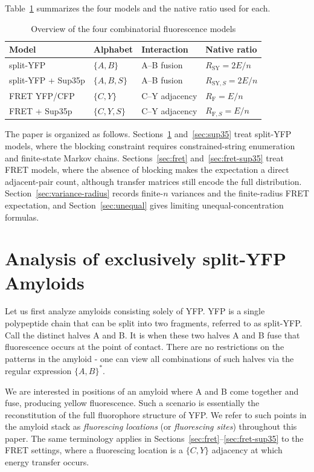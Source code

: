 \documentclass[referee,lineno,pdflatex,sn-mathphys-ay]{sn-jnl}
\begin{document}
Table~\ref{tab:model-overview} summarizes the four models and the native ratio used for each.

\begin{table}[ht]
\caption{Overview of the four combinatorial fluorescence models}\label{tab:model-overview}
\centering
\begin{tabular}{llll}
\hline
Model & Alphabet & Interaction & Native ratio \\
\hline
split-YFP & $\{A,B\}$ & A--B fusion & $R_{\text{SY}}=2E/n$ \\
split-YFP + Sup35p & $\{A,B,S\}$ & A--B fusion & $R_{\text{SY},S}=2E/n$ \\
FRET YFP/CFP & $\{C,Y\}$ & C--Y adjacency & $R_{\text{F}}=E/n$ \\
FRET + Sup35p & $\{C,Y,S\}$ & C--Y adjacency & $R_{\text{F},S}=E/n$ \\
\hline
\end{tabular}
\end{table}

The paper is organized as follows. Sections~\ref{sec:split-yfp} and~\ref{sec:sup35} treat split-YFP models, where the blocking constraint requires constrained-string enumeration and finite-state Markov chains. Sections~\ref{sec:fret} and~\ref{sec:fret-sup35} treat FRET models, where the absence of blocking makes the expectation a direct adjacent-pair count, although transfer matrices still encode the full distribution. Section~\ref{sec:variance-radius} records finite-$n$ variances and the finite-radius FRET expectation, and Section~\ref{sec:unequal} gives limiting unequal-concentration formulas.

\section{Analysis of exclusively split-YFP Amyloids}\label{sec:split-yfp}
Let us first analyze amyloids consisting solely of YFP. YFP is a single polypeptide chain that can be split into two fragments, referred to as split-YFP. Call the distinct halves A and B. It is when these two halves A and B fuse that fluorescence occurs at the point of contact. There are no restrictions on the patterns in the amyloid - one can view all combinations of such halves via the regular expression $\{A,B\}^*$. 

We are interested in positions of an amyloid where A and B come together and fuse, producing yellow fluorescence. Such a scenario is essentially the reconstitution of the full fluorophore structure of YFP. We refer to such points in the amyloid stack as \textit{fluorescing locations} (or \textit{fluorescing sites}) throughout this paper. The same terminology applies in Sections~\ref{sec:fret}--\ref{sec:fret-sup35} to the FRET settings, where a fluorescing location is a $\{C, Y\}$ adjacency at which energy transfer occurs.
\end{document}
